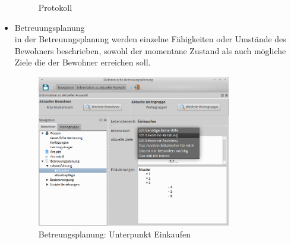 \begin{itemize}
\begin{figure}[h!]
\begin{center}
			\caption{Protokoll}
		\end{center}
	\end{figure}
	\FloatBarrier
	\newpage
	\item Betreuungsplanung\mbox{}\\
	\noindent
	in der Betreuungsplanung werden einzelne Fähigkeiten oder Umstände des Bewohners beschrieben, sowohl der momentane Zustand als auch mögliche Ziele die der Bewohner erreichen soll.
	\begin{figure}[h!]
		\begin{center}
			\includegraphics[keepaspectratio=true, width=0.8\textwidth]{pics/client_lebensfuehrung.png}
			\caption{Betreungsplanung: Unterpunkt Einkaufen}
		\end{center}
	\end{figure}
\end{itemize}
\newpage
